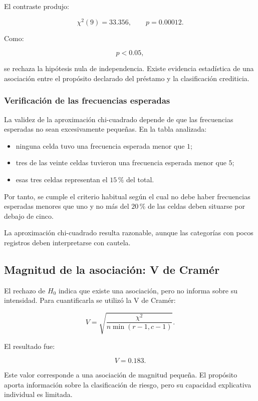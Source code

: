 El contraste produjo:

\[
\chi^2(9)=33.356,
\qquad
p=0.00012.
\]

Como:

\[
p<0.05,
\]

se rechaza la hipótesis nula de independencia. Existe evidencia
estadística de una asociación entre el propósito declarado del préstamo
y la clasificación crediticia.

\subsubsection{Verificación de las frecuencias esperadas}

La validez de la aproximación chi-cuadrado depende de que las frecuencias
esperadas no sean excesivamente pequeñas. En la tabla analizada:

\begin{itemize}
    \item ninguna celda tuvo una frecuencia esperada menor que \(1\);

    \item tres de las veinte celdas tuvieron una frecuencia esperada
    menor que \(5\);

    \item esas tres celdas representan el \(15\,\%\) del total.
\end{itemize}

Por tanto, se cumple el criterio habitual según el cual no debe haber
frecuencias esperadas menores que uno y no más del \(20\,\%\) de las
celdas deben situarse por debajo de cinco.

La aproximación chi-cuadrado resulta razonable, aunque las categorías con
pocos registros deben interpretarse con cautela.

\subsection{Magnitud de la asociación: V de Cramér}

El rechazo de \(H_0\) indica que existe una asociación, pero no informa
sobre su intensidad. Para cuantificarla se utilizó la V de Cramér:

\[
V
=
\sqrt{
    \frac{
        \chi^2
    }{
        n\min(r-1,c-1)
    }
}.
\]

El resultado fue:

\[
V=0.183.
\]

Este valor corresponde a una asociación de magnitud pequeña. El propósito
aporta información sobre la clasificación de riesgo, pero su capacidad
explicativa individual es limitada.

